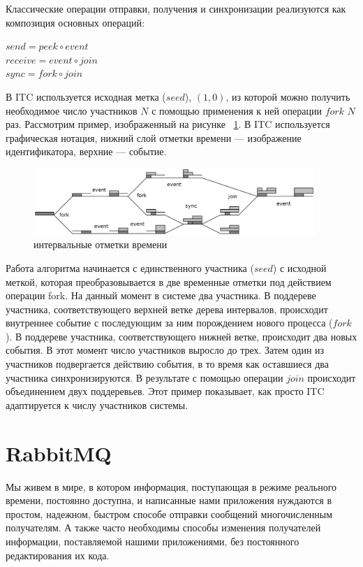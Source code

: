 Классические операции отправки, получения и синхронизации реализуются как композиция основных операций:
\begin{center}
$send = peek \circ event$\\
$receive = event \circ join$\\
$sync = fork \circ join$
\end{center}
В ITC используется исходная метка ($seed$), $(1,0)$, из которой можно получить необходимое число участников $N$ с помощью применения к ней операции $fork$ $N$ раз.
Рассмотрим пример, изображенный на рисунке ~\ref{fig:tree}. В ITC используется графическая нотация, нижний слой отметки времени --- изображение идентификатора, верхние --- событие. 
\begin{figure}
\centering
\includegraphics[width=0.95\textwidth]{img/tree.png}
\caption{интервальные отметки времени}
\label{fig:tree}
\end{figure}
Работа алгоритма начинается с единственного участника ($seed$) с исходной меткой, которая преобразовывается в две временные отметки под действием операции fork. На данный момент в системе два участника. В поддереве участника, соответствующего верхней ветке дерева интервалов, происходит внутреннее событие с последующим за ним порождением нового процесса ($fork$). В поддереве участника, соответствующего нижней ветке, происходит два новых события. В этот момент число участников выросло до трех. Затем один из участников подвергается действию события, в то время как оставшиеся два участника синхронизируются. В результате с помощью операции $join$ происходит объединением двух поддеревьев. Этот пример показывает, как просто ITC адаптируется к числу участников системы.

\chapter{RabbitMQ} 
\label{sec:examples}
Мы живем в мире, в котором информация, поступающая в режиме реального времени, постоянно доступна, и написанные нами приложения нуждаются в простом, надежном, быстром способе отправки сообщений многочисленным получателям. А также часто необходимы способы изменения получателей информации, поставляемой нашими приложениями, без постоянного редактирования их кода.


